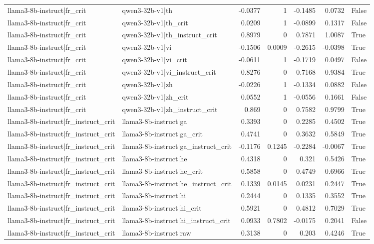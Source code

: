 \begin{table}
\begin{tabular}{l l r r r r l}
llama3-8b-instruct|fr_crit & qwen3-32b-v1|th & -0.0377 & 1 & -0.1485 & 0.0732 & False \\
llama3-8b-instruct|fr_crit & qwen3-32b-v1|th_crit & 0.0209 & 1 & -0.0899 & 0.1317 & False \\
llama3-8b-instruct|fr_crit & qwen3-32b-v1|th_instruct_crit & 0.8979 & 0 & 0.7871 & 1.0087 & True \\
llama3-8b-instruct|fr_crit & qwen3-32b-v1|vi & -0.1506 & 0.0009 & -0.2615 & -0.0398 & True \\
llama3-8b-instruct|fr_crit & qwen3-32b-v1|vi_crit & -0.0611 & 1 & -0.1719 & 0.0497 & False \\
llama3-8b-instruct|fr_crit & qwen3-32b-v1|vi_instruct_crit & 0.8276 & 0 & 0.7168 & 0.9384 & True \\
llama3-8b-instruct|fr_crit & qwen3-32b-v1|zh & -0.0226 & 1 & -0.1334 & 0.0882 & False \\
llama3-8b-instruct|fr_crit & qwen3-32b-v1|zh_crit & 0.0552 & 1 & -0.0556 & 0.1661 & False \\
llama3-8b-instruct|fr_crit & qwen3-32b-v1|zh_instruct_crit & 0.869 & 0 & 0.7582 & 0.9799 & True \\
llama3-8b-instruct|fr_instruct_crit & llama3-8b-instruct|ga & 0.3393 & 0 & 0.2285 & 0.4502 & True \\
llama3-8b-instruct|fr_instruct_crit & llama3-8b-instruct|ga_crit & 0.4741 & 0 & 0.3632 & 0.5849 & True \\
llama3-8b-instruct|fr_instruct_crit & llama3-8b-instruct|ga_instruct_crit & -0.1176 & 0.1245 & -0.2284 & -0.0067 & True \\
llama3-8b-instruct|fr_instruct_crit & llama3-8b-instruct|he & 0.4318 & 0 & 0.321 & 0.5426 & True \\
llama3-8b-instruct|fr_instruct_crit & llama3-8b-instruct|he_crit & 0.5858 & 0 & 0.4749 & 0.6966 & True \\
llama3-8b-instruct|fr_instruct_crit & llama3-8b-instruct|he_instruct_crit & 0.1339 & 0.0145 & 0.0231 & 0.2447 & True \\
llama3-8b-instruct|fr_instruct_crit & llama3-8b-instruct|hi & 0.2444 & 0 & 0.1335 & 0.3552 & True \\
llama3-8b-instruct|fr_instruct_crit & llama3-8b-instruct|hi_crit & 0.5921 & 0 & 0.4812 & 0.7029 & True \\
llama3-8b-instruct|fr_instruct_crit & llama3-8b-instruct|hi_instruct_crit & 0.0933 & 0.7802 & -0.0175 & 0.2041 & False \\
llama3-8b-instruct|fr_instruct_crit & llama3-8b-instruct|raw & 0.3138 & 0 & 0.203 & 0.4246 & True \\

\end{tabular}
\end{table}
